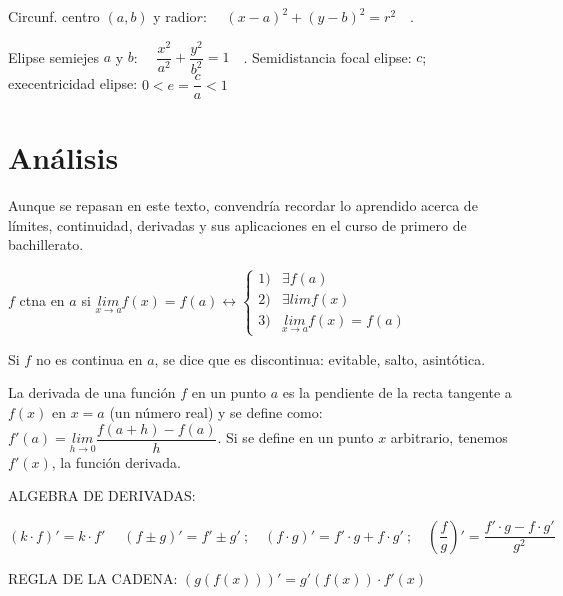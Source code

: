 Circunf. centro $(a,b)$ y radio$r$: $\quad (x-a)^2+(y-b)^2=r^2 \quad $. 

Elipse semiejes $a$ y $b$: $\quad \dfrac {x^2}{a^2} + \dfrac {y^2}{b^2} = 1 	\quad $. Semidistancia focal elipse: $c$; execentricidad elipse: $0<e=\dfrac c a < 1$

\section{Análisis}

Aunque se repasan en este texto, convendría recordar lo aprendido acerca de límites, continuidad, derivadas y sus aplicaciones en el curso de primero de bachillerato.

$f$ ctna en $a$ si $\underset{x\to a}{lim}{f(x)}=f(a) \leftrightarrow \begin{cases}
 	1) & \exists f(a) \\
 	2) & \exists {lim}{f(x)} \\
 	3) & \underset{x\to a}{lim}{f(x)}=f(a)
 	\end{cases}$

Si $f$ no es continua en $a$, se dice que es discontinua: evitable, salto, asintótica.


La derivada de una función $f$ en un punto $a$ es la pendiente de la recta tangente a $f(x)$ en $x=a$ (un número real) y se define como: $f'(a)=\underset{h\to 0}{lim}{\dfrac {f(a+h)-f(a)}{h}}$. Si se define en un punto $x$ arbitrario, tenemos $f'(x)$, la función derivada.

ALGEBRA DE DERIVADAS:
		
		$(k\cdot f)'=k\cdot f' \; \quad (f\pm g)'=f' \pm g'\ ;  \quad (f\cdot g)'=f'\cdot g + f\cdot g' \ ; \quad \left({\dfrac f g}\right) '=\dfrac {f'\cdot g - f\cdot g'}{g^2}$
		
		\vspace{5mm}
		
		REGLA DE LA CADENA:  $\left({g\left (f(x) \right)}\right)' = g'\left(f(x) \right) \cdot f'(x)$
		
		\vspace{5mm}
		

